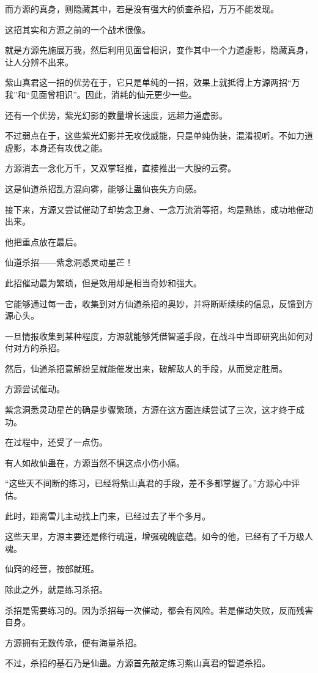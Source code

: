 \begin{this_body}
而方源的真身，则隐藏其中，若是没有强大的侦查杀招，万万不能发现。

这招其实和方源之前的一个战术很像。

就是方源先施展万我，然后利用见面曾相识，变作其中一个力道虚影，隐藏真身，让人分辨不出来。

紫山真君这一招的优势在于，它只是单纯的一招，效果上就抵得上方源两招“万我”和“见面曾相识”。因此，消耗的仙元更少一些。

还有一个优势，紫光幻影的数量增长速度，远超力道虚影。

不过弱点在于，这些紫光幻影并无攻伐威能，只是单纯伪装，混淆视听。不如力道虚影，本身还有攻伐之能。

方源消去一念化万千，又双掌轻推，直接推出一大股的云雾。

这是仙道杀招乱方混向雾，能够让蛊仙丧失方向感。

接下来，方源又尝试催动了却势念卫身、一念万流消等招，均是熟练，成功地催动出来。

他把重点放在最后。

仙道杀招——紫念洞悉灵动星芒！

此招催动最为繁琐，但是效用却是相当奇妙和强大。

它能够通过每一击，收集到对方仙道杀招的奥妙，并将断断续续的信息，反馈到方源心头。

一旦情报收集到某种程度，方源就能够凭借智道手段，在战斗中当即研究出如何对付对方的杀招。

然后，仙道杀招意解纷呈就能催发出来，破解敌人的手段，从而奠定胜局。

方源尝试催动。

紫念洞悉灵动星芒的确是步骤繁琐，方源在这方面连续尝试了三次，这才终于成功。

在过程中，还受了一点伤。

有人如故仙蛊在，方源当然不惧这点小伤小痛。

“这些天不间断的练习，已经将紫山真君的手段，差不多都掌握了。”方源心中评估。

此时，距离雪儿主动找上门来，已经过去了半个多月。

这些天里，方源主要还是修行魂道，增强魂魄底蕴。如今的他，已经有了千万级人魂。

仙窍的经营，按部就班。

除此之外，就是练习杀招。

杀招是需要练习的。因为杀招每一次催动，都会有风险。若是催动失败，反而残害自身。

方源拥有无数传承，便有海量杀招。

不过，杀招的基石乃是仙蛊。方源首先敲定练习紫山真君的智道杀招。


\end{this_body}
